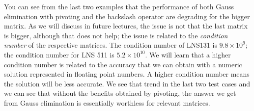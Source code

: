 You can see from the last two examples that the performance of both Gauss elimination with pivoting and the backslash operator are degrading for the bigger matrix.  As we will discuss in future lectures, the issue is not that the last matrix is bigger, although that does not help; the issue is related to the \emph{condition number} of the respective matrices.  The condition number of LNS131 is $9.8\times 10^9$; the condition number for LNS 511 is $5.2 \times 10^{10}$.  We will learn that a higher condition number is related to the accuracy that we can obtain with a numeric solution represented in floating point numbers.  A higher condition number means the solution will be less accurate.  We see that trend in the last two test cases and we can see that without the benefits obtained by pivoting, the answer we get from Gauss elimination is essentially worthless for relevant matrices.


